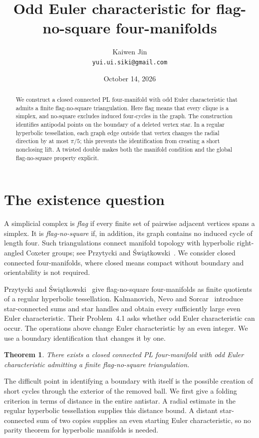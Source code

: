 \documentclass[11pt]{article}
\title{Odd Euler characteristic for flag-no-square four-manifolds}
\author{Kaiwen Jin\\\small\texttt{yui.ui.siki@gmail.com}}
\date{October 14, 2026}
\newtheorem{theorem}{Theorem}
\begin{document}
\maketitle

\begin{abstract}
We construct a closed connected PL four-manifold with odd Euler
characteristic that admits a finite flag-no-square triangulation.
Here flag means that every clique is a simplex, and no-square excludes
induced four-cycles in the graph. The construction identifies antipodal
points on the boundary of a deleted vertex star. In a regular hyperbolic
tessellation, each graph edge outside that vertex changes the radial
direction by at most $\pi/5$; this prevents the identification from creating
a short nonclosing lift. A twisted double makes both the manifold
condition and the global flag-no-square property explicit.
\end{abstract}

\section{The existence question}

A simplicial complex is \emph{flag} if every finite set of pairwise adjacent
vertices spans a simplex. It is \emph{flag-no-square} if, in addition,
its graph contains no induced cycle of length four. Such triangulations
connect manifold topology with hyperbolic right-angled Coxeter groups;
see Przytycki and \'{S}wi\k{a}tkowski~\cite{PS}.
We consider closed connected four-manifolds, where closed means compact
without boundary and orientability is not required.

Przytycki and \'{S}wi\k{a}tkowski~\cite[Remark~4.4(2)]{PS} give
flag-no-square four-manifolds as finite quotients of a regular hyperbolic
tessellation. Kalmanovich, Nevo and Sorcar~\cite{KNS} introduce
star-connected sums and star handles and obtain every sufficiently large
even Euler characteristic. Their Problem~4.1 asks whether odd Euler
characteristic can occur. The operations above change Euler characteristic
by an even integer. We use a boundary identification that changes it by one.

\begin{theorem}\label{thm:main}
There exists a closed connected PL four-manifold with odd Euler
characteristic admitting a finite flag-no-square triangulation.
\end{theorem}

The difficult point in identifying a boundary with itself is the possible
creation of short cycles through the exterior of the removed ball.
We first give a folding criterion in terms of distance in the entire
antistar. A radial estimate in the regular hyperbolic tessellation supplies
this distance bound. A distant star-connected sum of two copies supplies
an even starting Euler characteristic, so no parity theorem for hyperbolic
manifolds is needed.
\end{document}
